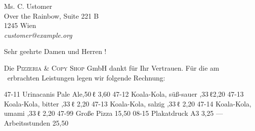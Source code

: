 \documentclass[fontsize=11pt,parskip=half]{scrlttr2}
\begin{document}
	\def\invoicenumber	{43}	%
					\def\payperiod		{10}	%
					\def\daysago		{1}		%
					\def\servicedate	{2022-07-15}
	\begin{letter}{%
						Ms. C. Ustomer\\
						Over the Rainbow, Suite 221\kern 1pt B\\
						1245 Wien\\[1ex]
						\hfill\emph{customer@example.org}
	}
		\opening{\vspace{-2.5ex} Sehr geehrte Damen und Herren\kern 1pt !}

		Die \textsc{Pizzeria \& Copy Shop} GmbH dankt für Ihr Vertrauen.
		Für die am \printservicedate\ erbrachten Leistungen legen wir folgende Rechnung:

			\AdvanceDate[\daysago]		%
			\vspace{1ex}\par			%

		\begin{invoice*}[N]				%
			\NumbersOn					%
			\SeparatorOff

			\makeatletter\renewcommand*{}\makeatother	

	{47-11}		{Urinacanis Pale Ale,50\,ℓ}	{3,60}
	{47-12}		{Koala-Kola, süß-sauer ,33\,ℓ}{2,20}
	{47-13}		{Koala-Kola, bitter ,33\,ℓ}	{2,20}
	{47-13}		{Koala-Kola, salzig ,33\,ℓ}	{2,20}
	{47-14}		{Koala-Kola, umami ,33\,ℓ}	{2,20}
	{47-99}		{Große Pizza}						{15,50}
	{08-15}		{Plakatdruck \tab A3}				{3,25}
	{---~~~}	{Arbeitsstunden}					{25,50}
\enlargethispage{3\baselineskip}	%
		\end{invoice*}


\end{letter}
\end{document}
